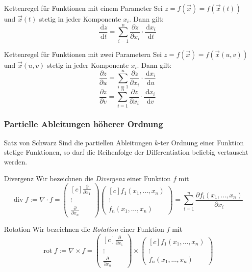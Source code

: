 \documentclass[german]{../spicker}
\newcommand{\vektor}[1]{\begin{pmatrix*}[c] #1 \end{pmatrix*}}
\renewcommand{\d}{\,\mathrm{d}}
\begin{document}
\begin{defi}{Kettenregel für Funktionen mit einem Parameter}
    Sei $z = f(\vec{x}) = f(\vec{x}(t))$ und $\vec{x}(t)$ stetig in jeder Komponente $x_i$. Dann gilt:
    $$
        \frac{\d z}{\d t} = \sum_{i=1}^n \frac{\partial z}{\partial x_i} \cdot \frac{\d x_i}{\d t}
    $$
\end{defi}

\begin{defi}{Kettenregel für Funktionen mit zwei Parametern}
    Sei $z = f(\vec{x}) = f(\vec{x}(u,v))$ und $\vec{x}(u,v)$ stetig in jeder Komponente $x_i$. Dann gilt:
    $$
        \frac{\partial z}{\partial u} = \sum_{i=1}^n \frac{\partial z}{\partial x_i} \cdot \frac{\d x_i}{\d u}
    $$
    $$
        \frac{\partial z}{\partial v} = \sum_{i=1}^n \frac{\partial z}{\partial x_i} \cdot \frac{\d x_i}{\d v}
    $$
\end{defi}

\subsubsection{Partielle Ableitungen höherer Ordnung}

\begin{defi}{Satz von Schwarz}
    Sind die partiellen Ableitungen $k$-ter Ordnung einer Funktion stetige Funktionen, so darf die Reihenfolge der Differentiation beliebig vertauscht werden.
\end{defi}

\begin{defi}{Divergenz}
    Wir bezeichnen die \emph{Divergenz} einer Funktion $f$ mit
    $$
        \operatorname{div} f := \nabla \cdot f = \vektor{\frac{\partial}{\partial x_1} \\ \vdots \\ \frac{\partial}{\partial x_n}} \vektor{f_1(x_1, \ldots, x_n) \\ \vdots \\ f_n(x_1, \ldots, x_n)} = \sum_{i=1}^n \frac{\partial f_i(x_1, \ldots, x_n)}{\partial x_i}
    $$
\end{defi}

\begin{defi}{Rotation}
    Wir bezeichnen die \emph{Rotation} einer Funktion $f$ mit
    $$
        \operatorname{rot} f := \nabla \times f = \vektor{\frac{\partial}{\partial x_1} \\ \vdots \\ \frac{\partial}{\partial x_n}} \times \vektor{f_1(x_1, \ldots, x_n) \\ \vdots \\ f_n(x_1, \ldots, x_n)}
    $$
\end{defi}
\end{document}
